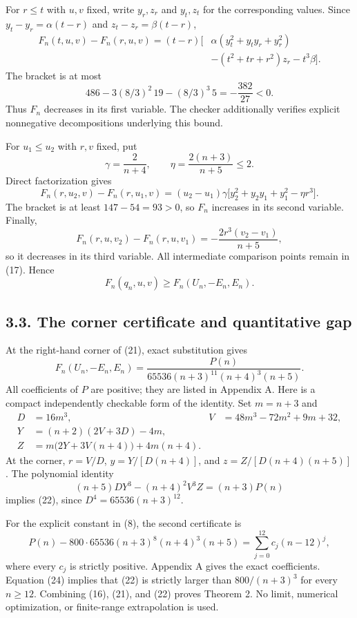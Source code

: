 \documentclass[
  11pt,
  a4paper,
]{article}
\begin{document}
For \(r\le t\) with \(u,v\) fixed, write \(y_r,z_r\) and \(y_t,z_t\) for
the corresponding values. Since \(y_t-y_r=\alpha(t-r)\) and
\(z_t-z_r=\beta(t-r)\), \[
\begin{aligned}
F_n(t,u,v)-F_n(r,u,v)
=(t-r)\bigl[&\alpha(y_t^2+y_ty_r+y_r^2)\\
&-(t^2+tr+r^2)z_r-t^3\beta\bigr].
\end{aligned}
\tag{18}
\] The bracket is at most \[
486-3(8/3)^2\,19-(8/3)^3\,5=-\frac{382}{27}<0.
\] Thus \(F_n\) decreases in its first variable. The checker
additionally verifies explicit nonnegative decompositions underlying
this bound.

For \(u_1\le u_2\) with \(r,v\) fixed, put \[
\gamma=\frac2{n+4},\qquad \eta=\frac{2(n+3)}{n+5}\le2.
\] Direct factorization gives \[
F_n(r,u_2,v)-F_n(r,u_1,v)
=(u_2-u_1)\gamma\bigl[y_2^2+y_2y_1+y_1^2-\eta r^3\bigr].
\tag{19}
\] The bracket is at least \(147-54=93>0\), so \(F_n\) increases in its
second variable. Finally, \[
F_n(r,u,v_2)-F_n(r,u,v_1)=-\frac{2r^3(v_2-v_1)}{n+5},
\tag{20}
\] so it decreases in its third variable. All intermediate comparison
points remain in (17). Hence \[
F_n(q_n,u,v)\ge F_n(U_n,-E_n,E_n).
\tag{21}
\]

\subsection{3.3. The corner certificate and quantitative
gap}\label{the-corner-certificate-and-quantitative-gap}

At the right-hand corner of (21), exact substitution gives \[
F_n(U_n,-E_n,E_n)
=\frac{P(n)}{65536(n+3)^{11}(n+4)^3(n+5)}.
\tag{22}
\] All coefficients of \(P\) are positive; they are listed in Appendix
A. Here is a compact independently checkable form of the identity. Set
\(m=n+3\) and \[
\begin{aligned}
D&=16m^3,& V&=48m^3-72m^2+9m+32,\\
Y&=(n+2)(2V+3D)-4m,\\
Z&=m\bigl(2Y+3V(n+4)\bigr)+4m(n+4).
\end{aligned}
\] At the corner, \(r=V/D\), \(y=Y/[D(n+4)]\), and
\(z=Z/[D(n+4)(n+5)]\). The polynomial identity \[
(n+5)DY^3-(n+4)^2V^3Z=(n+3)P(n)
\tag{23}
\] implies (22), since \(D^4=65536(n+3)^{12}\).

For the explicit constant in (8), the second certificate is \[
P(n)-800\cdot65536(n+3)^8(n+4)^3(n+5)
=\sum_{j=0}^{12}c_j(n-12)^j,
\tag{24}
\] where every \(c_j\) is strictly positive. Appendix A gives the exact
coefficients. Equation (24) implies that (22) is strictly larger than
\(800/(n+3)^3\) for every \(n\ge12\). Combining (16), (21), and (22)
proves Theorem 2. No limit, numerical optimization, or finite-range
extrapolation is used.
\end{document}
